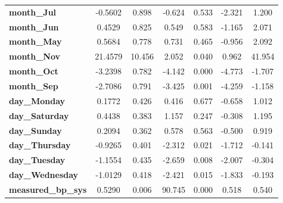 \documentclass[12 pt]{scrartcl}
\numberwithin{equation}{section}
\begin{document}
\begin{table}[htb]
\begin{center}
\begin{tabular}{|l||c|c|c|c|cc|}
        \textbf{month\_Jul}                       &      -0.5602  &        0.898     &    -0.624  &         0.533        &       -2.321    &        1.200     \\
        \textbf{month\_Jun}                       &       0.4529  &        0.825     &     0.549  &         0.583        &       -1.165    &        2.071     \\
        \textbf{month\_May}                       &       0.5684  &        0.778     &     0.731  &         0.465        &       -0.956    &        2.092     \\
        \textbf{month\_Nov}                       &      21.4579  &       10.456     &     2.052  &         0.040        &        0.962    &       41.954     \\
        \textbf{month\_Oct}                       &      -3.2398  &        0.782     &    -4.142  &         0.000        &       -4.773    &       -1.707     \\
        \textbf{month\_Sep}                       &      -2.7086  &        0.791     &    -3.425  &         0.001        &       -4.259    &       -1.158     \\ \hline
        \textbf{day\_Monday}                      &       0.1772  &        0.426     &     0.416  &         0.677        &       -0.658    &        1.012     \\
        \textbf{day\_Saturday}                    &       0.4438  &        0.383     &     1.157  &         0.247        &       -0.308    &        1.195     \\
        \textbf{day\_Sunday}                      &       0.2094  &        0.362     &     0.578  &         0.563        &       -0.500    &        0.919     \\
        \textbf{day\_Thursday}                    &      -0.9265  &        0.401     &    -2.312  &         0.021        &       -1.712    &       -0.141     \\
        \textbf{day\_Tuesday}                     &      -1.1554  &        0.435     &    -2.659  &         0.008        &       -2.007    &       -0.304     \\
        \textbf{day\_Wednesday}                   &      -1.0129  &        0.418     &    -2.421  &         0.015        &       -1.833    &       -0.193     \\ \hline
        \textbf{measured\_bp\_sys}                &       0.5290  &        0.006     &    90.745  &         0.000        &        0.518    &        0.540     \\ \hline

\end{tabular}
\end{center}
\end{table}
\end{document}
